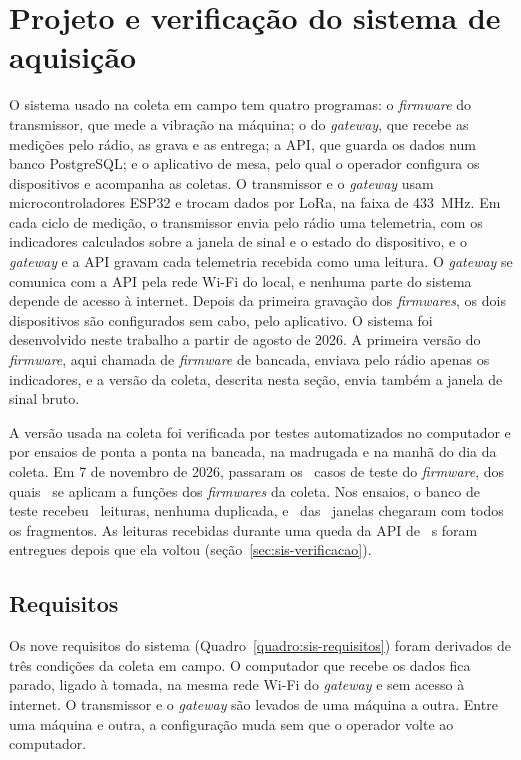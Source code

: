 \chapter{Projeto e verificação do sistema de aquisição}\label{cap:sistema}

O sistema usado na coleta em campo tem quatro programas: o \textit{firmware} do transmissor, que mede a vibração na máquina; o do \textit{gateway}, que recebe as medições pelo rádio, as grava e as entrega; a API, que guarda os dados num banco PostgreSQL; e o aplicativo de mesa, pelo qual o operador configura os dispositivos e acompanha as coletas. O transmissor e o \textit{gateway} usam microcontroladores ESP32 e trocam dados por LoRa, na faixa de \SI{433}{\mega\hertz}. Em cada ciclo de medição, o transmissor envia pelo rádio uma telemetria, com os indicadores calculados sobre a janela de sinal e o estado do dispositivo, e o \textit{gateway} e a API gravam cada telemetria recebida como uma leitura. O \textit{gateway} se comunica com a API pela rede Wi-Fi do local, e nenhuma parte do sistema depende de acesso à internet. Depois da primeira gravação dos \textit{firmwares}, os dois dispositivos são configurados sem cabo, pelo aplicativo. O sistema foi desenvolvido neste trabalho a partir de agosto de 2026. A primeira versão do \textit{firmware}, aqui chamada de \textit{firmware} de bancada, enviava pelo rádio apenas os indicadores, e a versão da coleta, descrita nesta seção, envia também a janela de sinal bruto.

A versão usada na coleta foi verificada por testes automatizados no computador e por ensaios de ponta a ponta na bancada, na madrugada e na manhã do dia da coleta. Em 7 de novembro de 2026, passaram os \sisTestesCasos\ casos de teste do \textit{firmware}, dos quais \sisTestesCampoCasos\ se aplicam a funções dos \textit{firmwares} da coleta. Nos ensaios, o banco de teste recebeu \sisBancoLeituras\ leituras, nenhuma duplicada, e \sisBancoJanelasCompletas\ das \sisBancoJanelas\ janelas chegaram com todos os fragmentos. As leituras recebidas durante uma queda da API de \sisQuedaApiS~s foram entregues depois que ela voltou (seção~\ref{sec:sis-verificacao}).

\section{Requisitos}\label{sec:sis-requisitos}

Os nove requisitos do sistema (Quadro~\ref{quadro:sis-requisitos}) foram derivados de três condições da coleta em campo. O computador que recebe os dados fica parado, ligado à tomada, na mesma rede Wi-Fi do \textit{gateway} e sem acesso à internet. O transmissor e o \textit{gateway} são levados de uma máquina a outra. Entre uma máquina e outra, a configuração muda sem que o operador volte ao computador.

